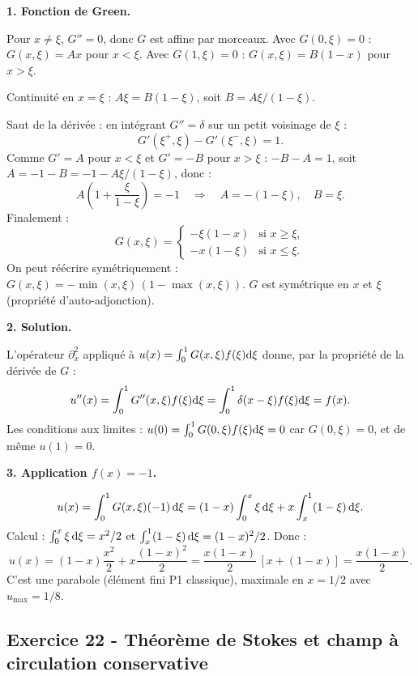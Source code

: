\documentclass[12pt,a4paper]{article}
\begin{document}
\begin{boitecorrige}

\textbf{1. Fonction de Green.}

Pour $x\neq\xi$, $G''=0$, donc $G$ est affine par morceaux. Avec $G(0,\xi)=0$ : $G(x,\xi) = A x$ pour $x<\xi$. Avec $G(1,\xi)=0$ : $G(x,\xi) = B(1-x)$ pour $x>\xi$.

Continuité en $x=\xi$ : $A\xi = B(1-\xi)$, soit $B = A\xi/(1-\xi)$.

Saut de la dérivée : en intégrant $G''=\delta$ sur un petit voisinage de $\xi$ :
\[
G'(\xi^+,\xi) - G'(\xi^-,\xi) = 1.
\]
Comme $G' = A$ pour $x<\xi$ et $G' = -B$ pour $x>\xi$ : $-B - A = 1$, soit $A = -1-B = -1-A\xi/(1-\xi)$, donc :
\[
A\!\left(1 + \frac{\xi}{1-\xi}\right) = -1 \quad\Rightarrow\quad A = -(1-\xi), \quad B = \xi.
\]
Finalement :
\[
G(x,\xi) = \begin{cases}
-\xi(1-x) & \text{si } x\ge\xi,\\
-x(1-\xi) & \text{si } x\le\xi.
\end{cases}
\]
On peut réécrire symétriquement : $G(x,\xi) = -\min(x,\xi)\,(1-\max(x,\xi))$. $G$ est symétrique en $x$ et $\xi$ (propriété d'auto-adjonction).

\textbf{2. Solution.}

L'opérateur $\partial_x^2$ appliqué à $u(x) = \int_0^1 G(x,\xi)f(\xi)\mathrm{d}\xi$ donne, par la propriété de la dérivée de $G$ :
\[
u''(x) = \int_0^1 G''(x,\xi) f(\xi)\mathrm{d}\xi = \int_0^1 \delta(x-\xi) f(\xi)\mathrm{d}\xi = f(x).
\]
Les conditions aux limites : $u(0) = \int_0^1 G(0,\xi) f(\xi)\mathrm{d}\xi = 0$ car $G(0,\xi)=0$, et de même $u(1)=0$.

\textbf{3. Application $f(x) = -1$.}

\[
u(x) = \int_0^1 G(x,\xi)(-1)\,\mathrm{d}\xi = (1-x)\int_0^x \xi\,\mathrm{d}\xi + x\int_x^1 (1-\xi)\,\mathrm{d}\xi.
\]
Calcul : $\int_0^x \xi\,\mathrm{d}\xi = x^2/2$ et $\int_x^1 (1-\xi)\,\mathrm{d}\xi = (1-x)^2/2$. Donc :
\[
u(x) = (1-x)\frac{x^2}{2} + x\frac{(1-x)^2}{2} = \frac{x(1-x)}{2}\,[x + (1-x)] = \frac{x(1-x)}{2}.
\]
C'est une parabole (élément fini P1 classique), maximale en $x=1/2$ avec $u_\text{max} = 1/8$.

\end{boitecorrige}

\subsection*{Exercice 22 - Théorème de Stokes et champ à circulation conservative \niveau{\moyen}}
\end{document}
